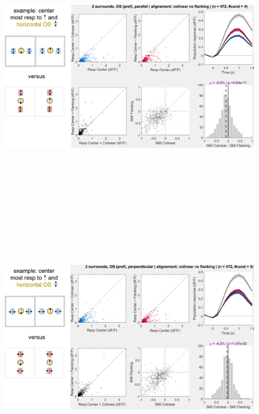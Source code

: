 \begin{figure}[H] \centering \includegraphics[width=11cm,height=11cm,keepaspectratio]{Figures/7.Results/population/sel/diagrams/13.png} 
\end{figure}

\begin{figure}[H] \centering \includegraphics[width=11cm,height=11cm,keepaspectratio]{Figures/7.Results/population/sel/diagrams/14.png} 
\end{figure}

